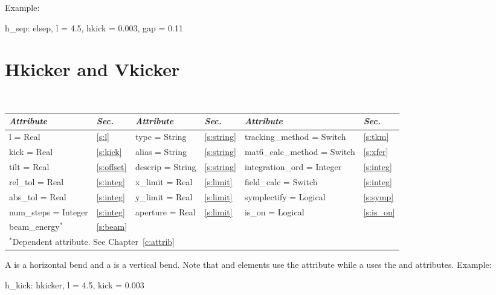 Example:
\begin{example}
  h_sep: elsep, l = 4.5, hkick = 0.003, gap = 0.11
\end{example}

\section{Hkicker and Vkicker}
\label{s:hvkicker}

\begin{center}
\tt
\begin{tabular}{|l|l||l|l||l|l|} \hline
  {\sl Attribute} & {\sl Sec.} & {\sl Attribute} & {\sl Sec.} &  {\sl Attribute} & {\sl Sec.} \\ \hline
  l        = Real       & \ref{s:l}       & type = String      & \ref{s:string} & tracking\_method = Switch    & \ref{s:tkm}   \\ \hline
  kick     = Real       & \ref{s:kick}    & alias = String     & \ref{s:string} & mat6\_calc\_method = Switch  & \ref{s:xfer}  \\ \hline
  tilt     = Real       & \ref{s:offset}  & descrip = String   & \ref{s:string} & integration\_ord = Integer   & \ref{s:integ} \\ \hline
  rel\_tol = Real       & \ref{s:integ}   & x\_limit = Real    & \ref{s:limit}  & field\_calc = Switch         & \ref{s:integ} \\ \hline 
  abs\_tol = Real       & \ref{s:integ}   & y\_limit = Real    & \ref{s:limit}  & symplectify = Logical        & \ref{s:symp}  \\ \hline
  num\_steps = Integer  & \ref{s:integ}   & aperture = Real    & \ref{s:limit}  & is\_on = Logical             & \ref{s:is_on} \\ \hline
  beam\_energy$^*$      & \ref{s:beam}    &                    &                &                              &               \\ \hline
  \multicolumn{6}{l}{\small $^*$Dependent attribute. See Chapter~\ref{c:attrib}} \\
\end{tabular}
\end{center}
\toffset

A  is a horizontal bend and a  is a vertical
bend.  Note that  and  elements use the
 attribute while a  uses the  and  
attributes. Example:
\begin{example}
  h_kick: hkicker, l = 4.5, kick = 0.003
\end{example}


